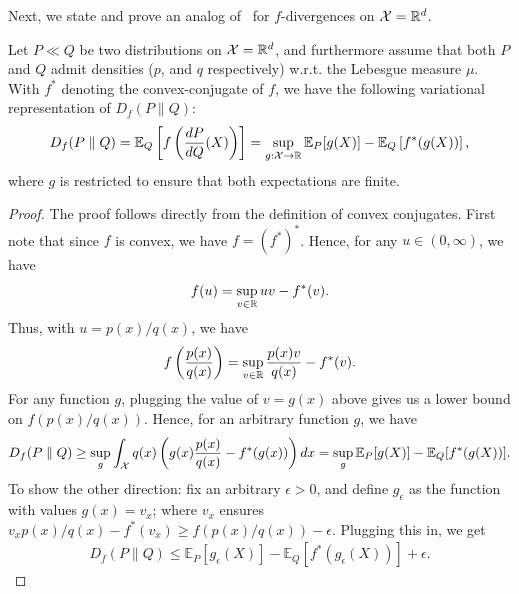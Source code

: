         
        Next, we state and prove an analog of~ for $f$-divergences on $\mathcal{X} = \mathbb{R}^d$.  
        \begin{theorem}
            Let $P \ll Q$ be two distributions on $\mathcal{X} = \mathbb{R}^d$, and furthermore assume that both $P$ and $Q$ admit densities ($p$, and $q$ respectively) w.r.t. the Lebesgue measure $\mu$. With $f^*$ denoting the convex-conjugate of $f$, we have the following variational representation of $D_f(P\parallel Q)$: 
            \begin{align}
                D_f(P\parallel Q) = \mathbb{E}_Q \left[ f\left( \frac{dP}{dQ}(X) \right) \right] = \sup_{g:\mathcal{X} \to \mathbb{R}} \mathbb{E}_P[g(X)] - \mathbb{E}_Q\left[ f^*(g(X)) \right], 
            \end{align}
            where $g$ is restricted to ensure that both expectations are finite. 
        \end{theorem}
        \begin{proof}
            The proof follows directly from the definition of convex conjugates. First note that since $f$ is convex, we have $f = (f^*)^*$. Hence, for any $u \in (0, \infty)$, we have 
            \begin{align}
                f(u) = \sup_{v \in \mathbb{R}} u v - f^*(v). 
            \end{align}
            Thus, with $u= p(x)/q(x)$, we have 
            \begin{align}
                f\left( \frac{p(x)}{q(x)} \right) = \sup_{v \in \mathbb{R}} \frac{p(x) v}{q(x)} - f^*(v). 
            \end{align}
            For any function $g$, plugging the value of $v = g(x)$ above gives us a lower bound on $f(p(x)/q(x))$. Hence, for an arbitrary function $g$, we have 
            \begin{align}
                D_f(P \parallel Q) \geq \sup_{g } \int_{\mathcal{X}} q(x) \left( g(x) \frac{p(x)}{q(x)} - f^*(g(x)) \right) dx = \sup_{g} \mathbb{E}_P[g(X)]  - \mathbb{E}_Q[f^*(g(X))]. 
            \end{align}
            To show the other direction: fix an arbitrary $\epsilon >0$, and define $g_\epsilon$ as the function with values $g(x) = v_x$; where $v_x$ ensures $v_x p(x)/q(x)- f^*(v_x) \geq f(p(x)/q(x)) - \epsilon$. Plugging this in, we get 
            \begin{align}
                D_f(P \parallel Q)  \leq   \mathbb{E}_P[g_\epsilon(X)] - \mathbb{E}_Q[f^*(g_\epsilon(X))]  + \epsilon. 
            \end{align}
        \end{proof}

